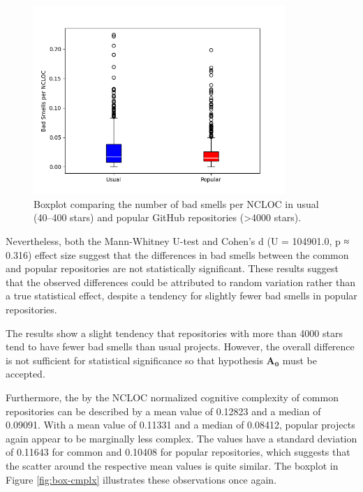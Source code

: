\documentclass[a4paper, 12pt]{article}
\begin{document}
\begin{figure}[h]
  \centering
  \includegraphics[width=0.85\textwidth]{./media/smells-boxplot.png}
  \caption{Boxplot comparing the number of bad smells per NCLOC in usual (40--400 stars) and popular GitHub repositories (>4000 stars).}
  \label{fig:box-smells}
\end{figure}

Nevertheless, both the Mann-Whitney U-test and Cohen's d (U = 104901.0, p ≈ 0.316) effect size suggest that the differences in bad smells between the common and popular repositories are not statistically significant. These results suggest that the observed differences could be attributed to random variation rather than a true statistical effect, despite a tendency for slightly fewer bad smells in popular repositories.

\vspace{0.5em}
\begin{leftbar}
The results show a slight tendency that repositories with more than 4000 stars tend to have fewer bad smells than usual projects. However, the overall difference is not sufficient for statistical significance so that hypothesis $\mathbf{A_0}$ must be accepted.
\end{leftbar}
\vspace{0.5em}

Furthermore, the by the NCLOC normalized cognitive complexity of common repositories can be described by a mean value of 0.12823 and a median of 0.09091. With a mean value of 0.11331 and a median of 0.08412, popular projects again appear to be marginally less complex. The values have a standard deviation of 0.11643 for common and 0.10408 for popular repositories, which suggests that the scatter around the respective mean values is quite similar. The boxplot in Figure \ref{fig:box-cmplx} illustrates these observations once again.\\
\end{document}
